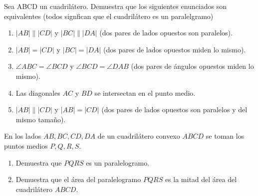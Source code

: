 \begin{ejercicio}
 Sea ABCD un cuadrilátero. Demuestra que los siguientes enunciados son equivalentes (todos signfican que el cuadrilátero es un paralelgramo) 
\begin{enumerate}
    \item $|AB|\parallel |CD|$ y $|BC|\parallel |DA|$ (dos pares de lados opuestos son paralelos).
    \item $|AB|= |CD|$ y $|BC|= |DA|$ (dos pares de lados opuestos miden lo mismo).
    \item $\angle ABC= \angle BCD$ y $\angle BCD= \angle DAB$ (dos pares de ángulos opuestos miden lo mismo).
    \item Las diagonales $AC$ y $BD$ se intersectan en el punto medio.
    \item $|AB|\parallel |CD|$ y $|AB|= |CD|$ (dos pares de lados opuestos son paralelos y del mismo tamaño).
\end{enumerate}
\end{ejercicio}

\begin{problema}
En los lados $AB, BC, CD, DA$ de un cuadrilátero convexo $ABCD$ se toman los puntos medios $P,Q,R,S$.
\begin{enumerate}
    \item Demuestra que $PQRS$ es un paralelogramo.
    \item Demuestra que el área del paralelogramo $PQRS$ es la mitad del área del cuadrilátero $ABCD$.
\end{enumerate}
\end{problema}


